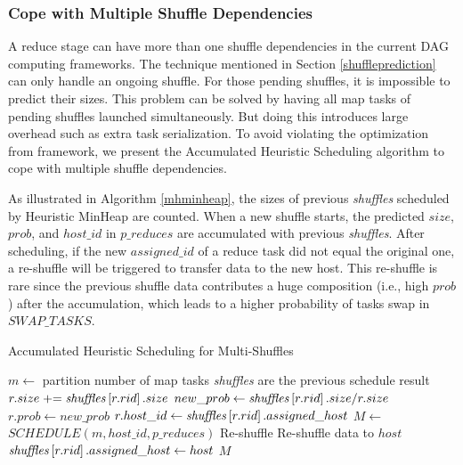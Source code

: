 \subsubsection{Cope with Multiple Shuffle Dependencies}
A reduce stage can have more than one shuffle dependencies in the current DAG computing frameworks. 
The technique mentioned in Section \ref{shuffleprediction} can only handle an ongoing shuffle. 
For those pending shuffles, it is impossible to predict their sizes. 
This problem can be solved by having all map tasks of pending shuffles launched simultaneously. 
But doing this introduces large overhead such as extra task serialization. 
To avoid violating the optimization from framework, we present the Accumulated Heuristic Scheduling algorithm to cope with multiple shuffle dependencies.

As illustrated in Algorithm \ref{mhminheap}, the sizes of previous \emph{shuffles} scheduled by Heuristic MinHeap are counted. 
When a new shuffle starts, the predicted $size$, $prob$, and $host\_id$ in $p\_reduces$ are accumulated with previous \emph{shuffles}. 
After scheduling, if the new $assigned\_id$ of a reduce task did not equal the original one, a re-shuffle will be triggered to transfer data to the new host. 
This re-shuffle is rare since the previous shuffle data contributes a huge composition (i.e., high $prob$) after the accumulation, 
which leads to a higher probability of tasks swap in $SWAP\_TASKS$. 

\noindent
\begin{minipage}{0.95\columnwidth}
\begin{algorithm}[H]
\caption{Accumulated Heuristic Scheduling for Multi-Shuffles}
\label{mhminheap}
	\begin{algorithmic}[1]
	\small
		\State $m\gets$ partition number of map tasks
		\Comment \emph{shuffles} are the previous schedule result 
			\State $r.size \mathrel{+}= \text{\emph{shuffles}}\left[r.rid\right].size$
			\State $new\_prob\gets \text{\emph{shuffles}}\left[r.rid\right].size / r.size$
				\State $r.prob\gets new\_prob$
				\State $r.host\_id\gets \text{\emph{shuffles}}\left[r.rid\right].assigned\_host$
			\EndIf
		\EndFor
		\State $M\gets$ $SCHEDULE\left(m, host\_id, p\_reduces\right)$
			\Comment Re-shuffle
				\State Re-shuffle data to $host$
				\State $\text{\emph{shuffles}}\left[r.rid\right].assigned\_host\gets host$
				\EndIf
			\EndFor
		\EndFor
		\Return $M$
	\EndProcedure
	\end{algorithmic}
\end{algorithm}
\end{minipage}

